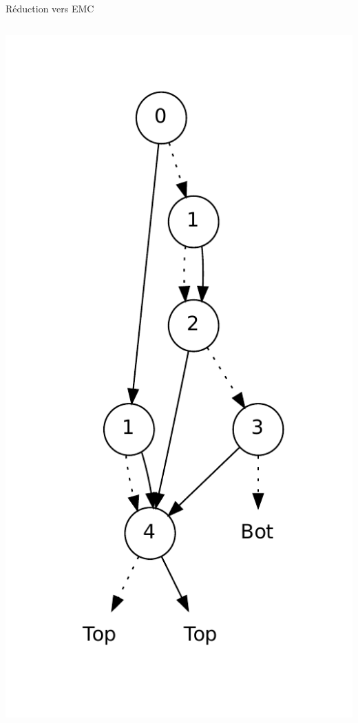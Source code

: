 \documentclass{beamer}
\begin{document}
\begin{frame}{Réduction vers EMC}
\begin{columns}
    \includegraphics[height=0.9\textheight]{../column.pdf}
  \end{columns}
\end{frame}
\end{document}
